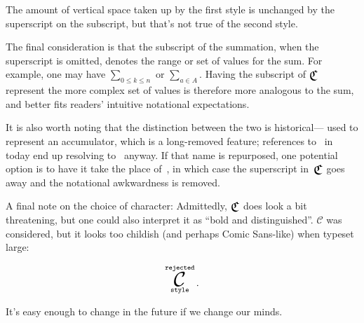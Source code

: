 The amount of vertical space taken up by the first style is unchanged by the
  superscript on the subscript,
    but that's not true of the second style.

The final consideration is that the subscript of the summation,
  when the superscript is omitted,
  denotes the range or set of values for the sum.
For example,
  one may have $\sum_{0\leq k \leq n}$ or
  $\sum_{a\in A}$.
Having the subscript of $\Classify$ represent the more complex set of values
  is therefore more analogous to the sum,
    and better fits readers' intuitive notational expectations.

It is also worth noting that the distinction between the two is historical---%
   used to represent an accumulator,
    which is a long-removed feature;
      references to~ in \tame{} today end up resolving
      to~ anyway.
If that name is repurposed,
  one potential option is to have it take the place of~,
    in which case the superscript in~$\Classify$ goes away and the
      notational awkwardness is removed.

A final note on the choice of character:
Admittedly, $\Classify$ does look a bit threatening,
  but one could also interpret it as ``bold and distinguished''.
$\mathcal{C}$ was considered,
  but it looks too childish (and perhaps Comic Sans-like) when typeset large:

\begin{equation*}
  \displaystyle\mathop{\hbox{\huge$\mathcal{C}$}}^\texttt{rejected}_\texttt{style}.
\end{equation*}

It's easy enough to change in the future if we change our minds.
